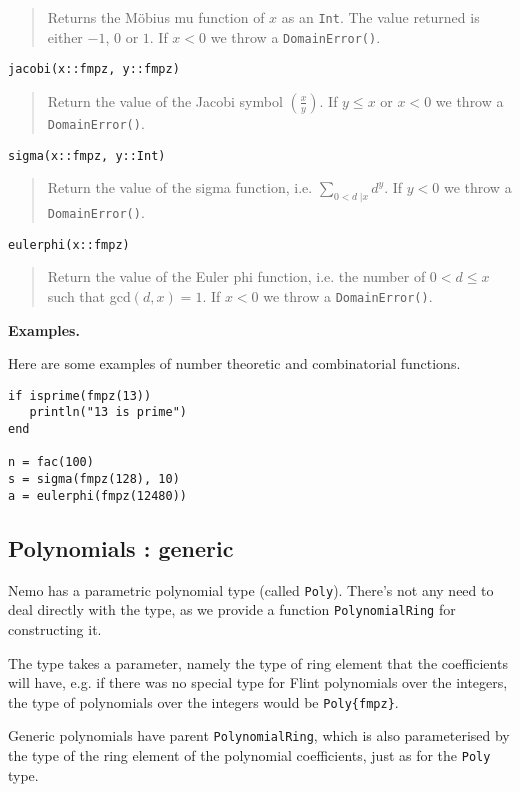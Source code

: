 \documentclass[a4paper,10pt]{article}
\newcommand{\code}{\lstinline}
\newcommand{\desc}[1]{\vspace{-3mm}\begin{quote}#1\end{quote}}
\newcommand{\ljk}[2]{\left(\frac{#1}{#2}\right)}
\begin{document}
{{\desc{Returns the M\"{o}bius mu function of $x$ as an \code{Int}. The value returned is
either $-1$, $0$ or $1$. If $x < 0$ we throw a \code{DomainError()}.}

\begin{lstlisting}
jacobi(x::fmpz, y::fmpz)
\end{lstlisting}

\desc{Return the value of the Jacobi symbol $\ljk{x}{y}$. If $y \leq x$ or $x < 0$ we
throw a \code{DomainError()}.}

\begin{lstlisting}
sigma(x::fmpz, y::Int)
\end{lstlisting}

\desc{Return the value of the sigma function, i.e. $\sum_{0 < d \;| x} d^y$. If $y < 0$
we throw a \code{DomainError()}.}

\begin{lstlisting}
eulerphi(x::fmpz)
\end{lstlisting}

\desc{Return the value of the Euler phi function, i.e. the number of $0 < d \leq x$ such
that gcd$(d, x) = 1$. If $x < 0$ we throw a \code{DomainError()}.}

\textbf{Examples.}

Here are some examples of number theoretic and combinatorial functions.

\begin{lstlisting}
if isprime(fmpz(13))
   println("13 is prime")
end

n = fac(100)
s = sigma(fmpz(128), 10)
a = eulerphi(fmpz(12480))
\end{lstlisting}

\subsection{Polynomials : generic}

Nemo has a parametric polynomial type (called \code{Poly}). There's not any need to deal
directly with the type, as we provide a function \code{PolynomialRing} for constructing
it.

The type takes a parameter, namely the type of ring element that the coefficients will
have, e.g. if there was no special type for Flint polynomials over the integers, the
type of polynomials over the integers would be \code|Poly{fmpz}|.

Generic polynomials have parent \code{PolynomialRing}, which is also parameterised by the
type of the ring element of the polynomial coefficients, just as for the \code{Poly} type.

}}
\end{document}
